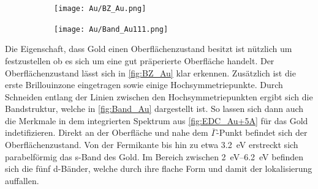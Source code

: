         \begin{figure}
            \centering
            \begin{subfigure}[t]{0.34\textwidth}
                \centering
                \texttt{[image: Au/BZ\_Au.png]}
                \label{fig:BZ_Au}
            \end{subfigure}
            \begin{subfigure}[t]{0.62\textwidth}
                \centering
                \texttt{[image: Au/Band\_Au111.png]}
                \label{fig:Band_Au}
            \end{subfigure}
        \end{figure}
        Die Eigenschaft, dass Gold einen Oberflächenzustand besitzt ist nützlich um festzustellen ob es sich um eine gut präperierte Oberfläche handelt.
        Der Oberflächenzustand lässt sich in \autoref{fig:BZ_Au} klar erkennen.
        Zusätzlich ist die erste Brillouinzone eingetragen sowie einige Hochsymmetriepunkte.
        Durch Schneiden entlang der Linien zwischen den Hochsymmetriepunkten ergibt sich die Bandstruktur, welche in \autoref{fig:Band_Au} dargestellt ist.
        So lassen sich dann auch die Merkmale in dem integrierten Spektrum aus \autoref{fig:EDC_Au+5A} für das Gold indetifizieren.
        Direkt an der Oberfläche und nahe dem $\overline{\Gamma}$-Punkt befindet sich der Oberflächenzustand.
        Von der Fermikante bis hin zu etwa \SI{3.2}{\electronvolt} erstreckt sich parabelförmig das s-Band des Gold.
        Im Bereich zwischen \SIrange{2}{6.2}{\electronvolt} befinden sich die fünf d-Bänder, welche durch ihre flache Form und damit der lokalisierung auffallen.


